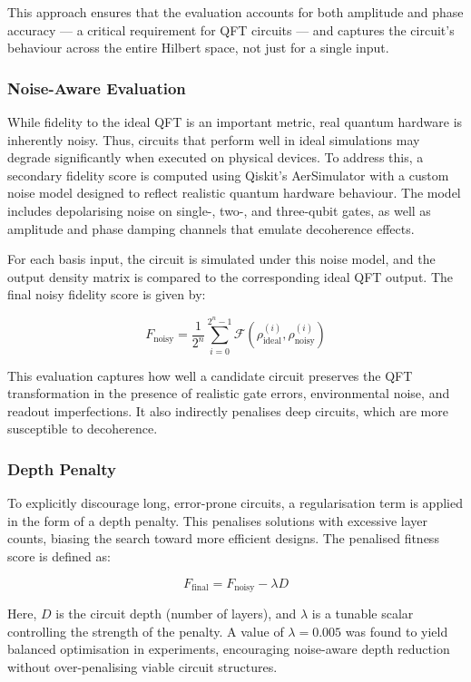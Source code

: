 \documentclass[11pt,a4paper]{article}
\begin{document}
This approach ensures that the evaluation accounts for both amplitude and phase accuracy — a critical requirement for QFT circuits — and captures the circuit’s behaviour across the entire Hilbert space, not just for a single input.

\subsubsection*{Noise-Aware Evaluation}

While fidelity to the ideal QFT is an important metric, real quantum hardware is inherently noisy. Thus, circuits that perform well in ideal simulations may degrade significantly when executed on physical devices. To address this, a secondary fidelity score is computed using Qiskit's AerSimulator with a custom noise model designed to reflect realistic quantum hardware behaviour. The model includes depolarising noise on single-, two-, and three-qubit gates, as well as amplitude and phase damping channels that emulate decoherence effects.\newline

For each basis input, the circuit is simulated under this noise model, and the output density matrix is compared to the corresponding ideal QFT output. The final noisy fidelity score is given by:

\[
F_{\text{noisy}} = \frac{1}{2^n} \sum_{i=0}^{2^n - 1} \mathcal{F} \left( \rho_{\text{ideal}}^{(i)}, \rho_{\text{noisy}}^{(i)} \right)
\]

This evaluation captures how well a candidate circuit preserves the QFT transformation in the presence of realistic gate errors, environmental noise, and readout imperfections. It also indirectly penalises deep circuits, which are more susceptible to decoherence.

\subsubsection*{Depth Penalty}

To explicitly discourage long, error-prone circuits, a regularisation term is applied in the form of a depth penalty. This penalises solutions with excessive layer counts, biasing the search toward more efficient designs. The penalised fitness score is defined as:

\[
F_{\text{final}} = F_{\text{noisy}} - \lambda D
\]

Here, $D$ is the circuit depth (number of layers), and $\lambda$ is a tunable scalar controlling the strength of the penalty. A value of $\lambda = 0.005$ was found to yield balanced optimisation in experiments, encouraging noise-aware depth reduction without over-penalising viable circuit structures.
\end{document}
